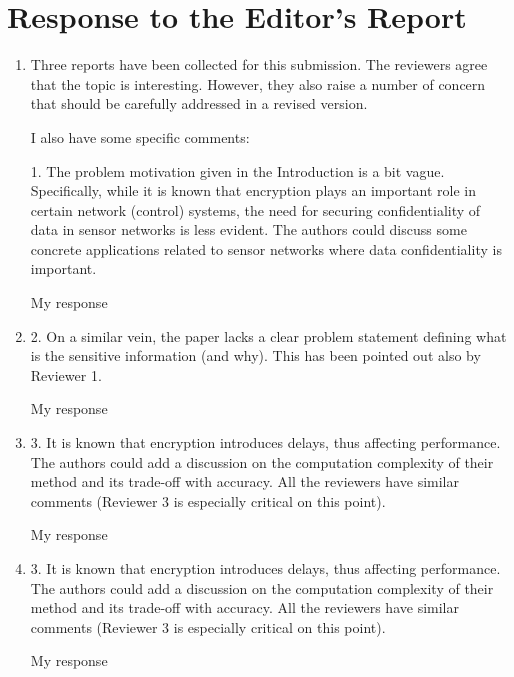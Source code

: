 \documentclass[a4paper]{scrartcl}
\newenvironment{rebuttal}{\begin{enumerate}[label={\color{grey}\thesection.\arabic{enumi}},leftmargin=0pt,ref=\thesection.\arabic{enumi}]}{\end{enumerate}}
\newcommand{\reviewtext}[1]{{\color{nblue} #1}}
\begin{document}
\section*{Response to the Editor's Report}
\def\thesection{E}
\begin{rebuttal} %
\item \reviewtext{Three reports have been collected for this submission. The reviewers
agree that the topic is interesting. However, they also raise a number
of concern that should be carefully addressed in a revised version. 

I also have some specific comments:

1. The problem motivation given in the Introduction is a bit vague.
Specifically, while it is known that encryption plays an important role
in certain network (control) systems, the need for securing
confidentiality of data in sensor networks is less evident. The authors
could discuss some concrete applications related to sensor networks
where data confidentiality is important.}

My response

\item \reviewtext{2. On a similar vein, the paper lacks a clear problem statement
defining what is the sensitive information (and why). This has been
pointed out also by Reviewer 1.}

My response

\item \reviewtext{3. It is known that encryption introduces delays, thus affecting
performance. The authors could add a discussion on the computation
complexity of their method and its trade-off with accuracy. All the
reviewers have similar comments (Reviewer 3 is especially critical on
this point).}

My response

\item \reviewtext{3. It is known that encryption introduces delays, thus affecting
performance. The authors could add a discussion on the computation
complexity of their method and its trade-off with accuracy. All the
reviewers have similar comments (Reviewer 3 is especially critical on
this point).}

My response

\end{rebuttal}

\end{document}
